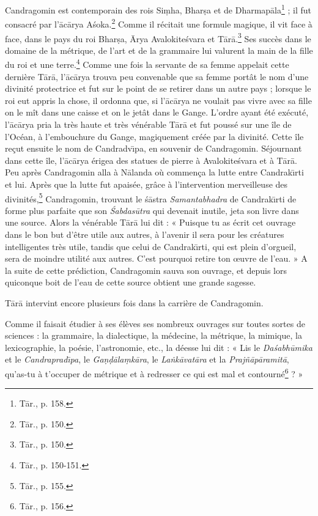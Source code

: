 \documentclass[a4paper, 11pt, oneside, french, landscape, twocolumn]{article}
\begin{document}
Candragomin est contemporain des rois Si\d{m}ha, Bhar\d{s}a et de Dharmap\={a}la\footnote{T\={a}r., p. 158.} ; il fut consacré par l'\={a}c\={a}rya A\'{s}oka.\footnote{T\={a}r., p. 150.} Comme il récitait une formule magique, il vit face à face, dans le pays du roi Bhar\d{s}a, \={A}rya Avalokite\'{s}vara et T\={a}r\={a}.\footnote{T\={a}r., p. 150.} Ses succès dans le domaine de la métrique, de l'art et de la grammaire lui valurent la main de la fille du roi et une terre.\footnote{T\={a}r., p. 150-151.} Comme une fois la servante de sa femme appelait cette dernière T\={a}r\={a}, l'\={a}c\={a}rya trouva peu convenable que sa femme portât le nom d'une divinité protectrice et fut sur le point de se retirer dans un autre pays ; lorsque le roi eut appris la chose, il ordonna que, si l'\={a}c\={a}rya ne voulait pas vivre avec sa fille on le mît dans une caisse et on le jetât dans le Gange. L'ordre ayant été exécuté, l'\={a}c\={a}rya pria la très haute et très vénérable T\={a}r\={a} et fut poussé sur une île de l'Océan, à l'embouchure du Gange, magiquement créée par la divinité. Cette île reçut ensuite le nom de Candradv\={\i}pa, en souvenir de Candragomin. Séjournant dans cette île, l'\={a}c\={a}rya érigea des statues de pierre à Avalokite\'{s}vara et à T\={a}r\={a}. Peu après Candragomin alla à N\={a}landa où commença la lutte entre Candrak\={\i}rti et lui. Après que la lutte fut apaisée, grâce à l'intervention merveilleuse des divinités,\footnote{T\={a}r., p. 155.} Candragomin, trouvant le \'{s}\={a}stra \emph{Samantabhadra} de Candrak\={\i}rti de forme plus parfaite que son \emph{\'{S}abdas\={u}tra} qui devenait inutile, jeta son livre dans une source. Alors la vénérable T\={a}r\={a} lui dit : « Puisque tu as écrit cet ouvrage dans le bon but d'être utile aux autres, à l'avenir il sera pour les créatures intelligentes très utile, tandis que celui de Candrak\={\i}rti, qui est plein d'orgueil, sera de moindre utilité aux autres. C'est pourquoi retire ton œuvre de l'eau. » A la suite de cette prédiction, Candragomin sauva son ouvrage, et depuis lors quiconque boit de l'eau de cette source obtient une grande sagesse.

T\={a}r\={a} intervint encore plusieurs fois dans la carrière de Candragomin.

Comme il faisait étudier à ses élèves ses nombreux ouvrages sur toutes sortes de sciences : la grammaire, la dialectique, la médecine, la métrique, la mimique, la lexicographie, la poésie, l'astronomie, etc., la déesse lui dit : « Lis le \emph{Da\'{s}abh\={u}mika} et le \emph{Candraprad\={\i}pa}, le \emph{Ga\d{n}\d{d}\={a}la\d{m}k\={a}ra}, le \emph{La\.{n}k\={a}vat\={a}ra} et la \emph{Praj\~{n}\={a}p\={a}ramit\={a}}, qu'as-tu à t'occuper de métrique et à redresser ce qui est mal et contourné\footnote{T\={a}r., p. 156.} ? »
\end{document}
